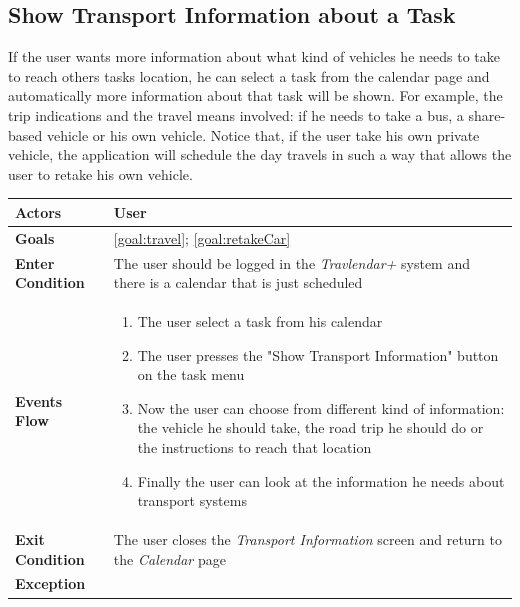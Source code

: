 \subsection{Show Transport Information about a Task}

If the user wants more information about what kind of vehicles he needs to take to reach others tasks location, he can select a task from the calendar page and automatically more information about that task will be shown. For example, the trip indications and the travel means involved: if he needs to take a bus, a share-based vehicle or his own vehicle. Notice that, if the user take his own private vehicle, the application will schedule the day travels in such a way that allows the user to retake his own vehicle. 

\begin{table}[H]
	\centering
    
    \begin{tabular}{|p{3.5cm}|p{10.3cm}|}
    
    \hline
    \textbf{\large{Actors}}  			& \tabitem User\\
    
    \hline
    \textbf{\large{Goals}} 				& \ref{goal:travel}; \ref{goal:retakeCar}\\
    
    \hline
    \textbf{\large{Enter Condition}}	& The user should be logged in the                                                                    \emph{Travlendar+} system and there is a calendar that is                                         just scheduled\\
    
    \hline
    \textbf{\large{Events Flow}}		& \begin{enumerate}[leftmargin=0.5cm]
                                          	\item The user select a task from his calendar
                                          	\item The user presses the "Show Transport Information" button on the task menu
                                          	\item Now the user can choose from different kind of information: the vehicle he should take, the road trip he should do or the instructions to reach that location
                                          	\item Finally the user can look at the information he needs about transport systems
                                          \end{enumerate}
    										\\
    \hline
    \textbf{\large{Exit Condition}} 	& The user closes the \emph{Transport Information} screen and return to the \emph{Calendar} page\\
    
    \hline
    \textbf{\large{Exception}} 			& \\
    
    \hline
    
    
    \end{tabular}
	
\end{table}

